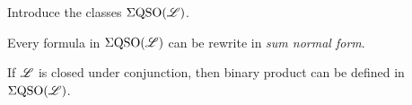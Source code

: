 
%	
%		
%		
%	
%	
%	
%	
%	

Introduce the classes $\Sigma{\rm QSO}(\mathscr{L})$.

\begin{theorem}
	Every formula in $\Sigma{\rm QSO}(\mathscr{L})$ can be rewrite in \emph{sum normal form}.
\end{theorem}

\begin{theorem}
	If $\mathscr{L}$ is closed under conjunction, then binary product can be defined in $\Sigma{\rm QSO}(\mathscr{L})$.
\end{theorem}

